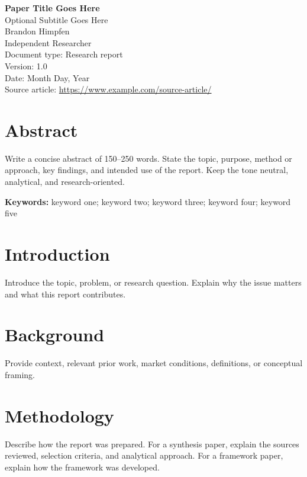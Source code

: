 \documentclass[11pt]{article}
\begin{document}
\begin{center}
{\LARGE \textbf{Paper Title Goes Here}}\\[0.5em]
{\large Optional Subtitle Goes Here}\\[0.8em]

Brandon Himpfen\\
Independent Researcher\\[0.5em]

Document type: Research report\\
Version: 1.0\\
Date: Month Day, Year\\
Source article: \url{https://www.example.com/source-article/}
\end{center}

\vspace{1em}

\section*{Abstract}

Write a concise abstract of 150--250 words. State the topic, purpose, method or approach, key findings, and intended use of the report. Keep the tone neutral, analytical, and research-oriented.

\textbf{Keywords:} keyword one; keyword two; keyword three; keyword four; keyword five

\section{Introduction}

Introduce the topic, problem, or research question. Explain why the issue matters and what this report contributes.

\section{Background}

Provide context, relevant prior work, market conditions, definitions, or conceptual framing.

\section{Methodology}

Describe how the report was prepared. For a synthesis paper, explain the sources reviewed, selection criteria, and analytical approach. For a framework paper, explain how the framework was developed.
\end{document}
